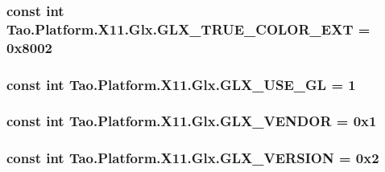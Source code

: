 \label{class_tao_1_1_platform_1_1_x11_1_1_glx_a4df6c260ab08a6d229d3d407e2ba1dc2}
\hypertarget{class_tao_1_1_platform_1_1_x11_1_1_glx_a9ccebdda70318edcdb01ec9040546701}{
\subsubsection[{GLX\_\-TRUE\_\-COLOR\_\-EXT}]{\setlength{\rightskip}{0pt plus 5cm}const int {\bf Tao.Platform.X11.Glx.GLX\_\-TRUE\_\-COLOR\_\-EXT} = 0x8002}}
\label{class_tao_1_1_platform_1_1_x11_1_1_glx_a9ccebdda70318edcdb01ec9040546701}
\hypertarget{class_tao_1_1_platform_1_1_x11_1_1_glx_aa9b8db15184e106df8fede97d26c1cc6}{
\subsubsection[{GLX\_\-USE\_\-GL}]{\setlength{\rightskip}{0pt plus 5cm}const int {\bf Tao.Platform.X11.Glx.GLX\_\-USE\_\-GL} = 1}}
\label{class_tao_1_1_platform_1_1_x11_1_1_glx_aa9b8db15184e106df8fede97d26c1cc6}
\hypertarget{class_tao_1_1_platform_1_1_x11_1_1_glx_a1a8d04f2c9ed80340eb6ddae62962c65}{
\subsubsection[{GLX\_\-VENDOR}]{\setlength{\rightskip}{0pt plus 5cm}const int {\bf Tao.Platform.X11.Glx.GLX\_\-VENDOR} = 0x1}}
\label{class_tao_1_1_platform_1_1_x11_1_1_glx_a1a8d04f2c9ed80340eb6ddae62962c65}
\hypertarget{class_tao_1_1_platform_1_1_x11_1_1_glx_ae1c13229f4b03607ede1ec39f5fdfade}{
\subsubsection[{GLX\_\-VERSION}]{\setlength{\rightskip}{0pt plus 5cm}const int {\bf Tao.Platform.X11.Glx.GLX\_\-VERSION} = 0x2}}
